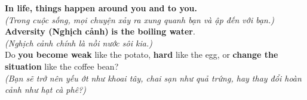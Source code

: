 \begin{baihoc}
  \textbf{In life, things happen around you and to you.}\\
  \textit{(Trong cuộc sống, mọi chuyện xảy ra xung quanh bạn và ập đến với bạn.)}\\
  \textbf{Adversity (Nghịch cảnh)} \textbf{is the boiling water}.\\
  \textit{(Nghịch cảnh chính là nồi nước sôi kia.)}\\
  Do \textbf{you become weak} like the potato, \textbf{hard} like the egg, or \textbf{change the situation} like the coffee bean?\\
  \textit{(Bạn sẽ trở nên yếu ớt như khoai tây, chai sạn như quả trứng, hay thay đổi hoàn cảnh như hạt cà phê?)}
\end{baihoc}

\vspace{0.8cm}


\ngayDay{}

